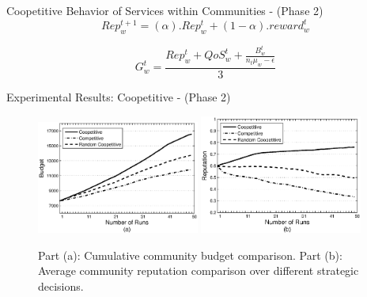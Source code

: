 \documentclass{beamer}
\begin{document}
\begin{frame}{Coopetitive Behavior of Services within Communities - (Phase 2)}
    \begin{equation*}\label{eq:repreprowthfactor}
        Rep_{w}^{t+1} = (\alpha).Rep_{w}^{t} + (1-\alpha).reward_{w}^{t}
    \end{equation*}

    \begin{equation*}\label{eq:growthfactor}
        G^t_w = \frac{Rep^t_w + QoS_w^t+\frac{B_w^t}{n_t  \mu_w -
        \epsilon}}{3}
    \end{equation*}

\end{frame}


\begin{frame}{Experimental Results: Coopetitive - (Phase 2)}
    \begin{figure}%
        \includegraphics[width=2.1in]{figures/graphbgtmed.eps}
        \includegraphics[width=2.1in]{figures/graphrep.eps}
        \caption{Part (a): Cumulative community budget comparison. Part
        (b): Average community reputation comparison over different
        strategic decisions.} \label{Graph1}
    \end{figure}
\end{frame}
\end{document}
